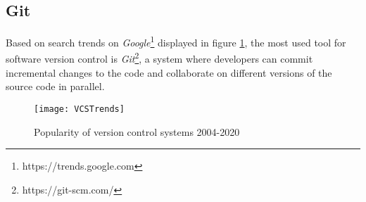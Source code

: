 \subsection{Git}

Based on search trends on \textit{Google}\footnote{https://trends.google.com} displayed in figure \ref{fig:vcstrends}, the most used tool for software version control is \textit{Git}\footnote{https://git-scm.com/}, a system where developers can commit incremental changes to the code and collaborate on different versions of the source code in parallel. 


\begin{figure}[b]
  \texttt{[image: VCSTrends]}
  \caption[VCS Trends]{Popularity of version control systems 2004-2020}
  \label{fig:vcstrends}
  \centering
\end{figure}